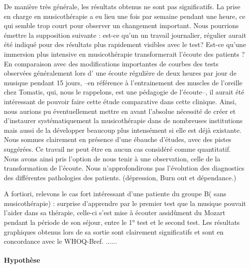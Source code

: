 \begin{enumerate}
  De manière très générale, les résultats obtenus ne
  sont pas significatifs.  La prise en charge en musicothérapie a eu lieu
  une fois par semaine pendant une heure, ce qui semble trop court pour observer un changement important. Nous pourrions émettre la supposition suivante :  est-ce qu'un un travail journalier, régulier aurait été indiqué pour des résultats plus rapidement visibles avec le test?
  Est-ce qu'une immersion plus intensive en musicothérapie transformerait l'écoute des patients ? 
   En comparaison avec des
  modifications importantes de courbes des tests observées généralement  lors d' une écoute
  régulière de deux heures par jour de musique pendant 15 jours, --en référence à l'entrainement des muscles de l'oreille chez Tomatis, qui, nous le rappelons, est une pédagogie de l'écoute--, il aurait été intéressant de pouvoir faire cette étude comparative dans cette clinique. Ainsi, nous aurions pu éventuellement mettre en avant  l'absolue nécessité de créer et d'instaurer systématiquement la musicothérapie dans de nombreuses institutions mais aussi  de la développer beaucoup plus intensément  si elle est déjà existante.
  Nous sommes clairement en présence d'une ébauche d'études, avec des pistes
  suggérées. Ce travail ne peut être en aucun cas considéré comme
  quantitatif.  Nous avons ainsi pris l'option de nous tenir à une
  observation, celle de la transformation de l'écoute. Nous n'approfondirons pas l'évolution des diagnostics des différentes
  pathologies des patients.  (dépression, Burn out et dépendance.)
  
  A fortiori, relevons le cas fort intéressant  d'une patiente du groupe B( sans
  musicothérapie) : 
surprise d'apprendre par le premier test que la musique pouvait l'aider
  dans sa thérapie, celle-ci s'est mise à écouter assidûment du Mozart pendant la période de son séjour, entre le 1° test et le second test.  Les résultats
  graphiques obtenus lors de sa sortie sont clairement significatifs
  et sont en concordance avec le WHOQ-Bref. 
  ......



   
   
   
   
  \end{enumerate}







\paragraph{Hypothèse}

